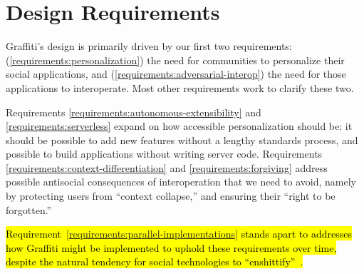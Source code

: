 \newtheorem{requirement}{Requirement}

\section{Design Requirements}
\label{requirements}

Graffiti's design is primarily driven by our
first two requirements:
(\ref{requirements:personalization})
the need for communities to personalize
their social applications,
and (\ref{requirements:adversarial-interop})
the need for those applications to interoperate.
Most other requirements work to clarify these two.

Requirements \ref{requirements:autonomous-extensibility}
and \ref{requirements:serverless} expand on how accessible
personalization should be: it should be possible to add new features
without a lengthy standards process, and possible to build
applications without writing server code.
Requirements \ref{requirements:context-differentiation}
and \ref{requirements:forgiving}
address possible antisocial consequences of
interoperation that we need to avoid,
namely by protecting users from ``context collapse,''
and ensuring their ``right to be forgotten.''

\hl{%
Requirement~{\ref{requirements:parallel-implementations}} stands apart to addresses
how Graffiti might be implemented to uphold these requirements over time, despite
the natural tendency for social technologies to ``enshittify''~{\cite{enshittification}}.
}%





